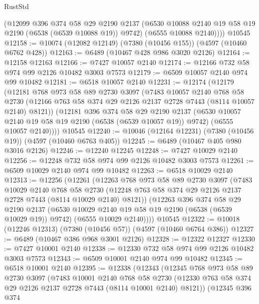 \begin{lexlean}{RustStd}
\begin{coremodule}
        (@12099
          @396
          @374
          @58
          @29
          @2190
          @2137
          (@6530 @10088 @2140 @19 @58 @19 @2190 (@6538 (@6539 @10088 @19)) @9742)
          (@6555 @10088 @2140))))
    @10545
@12158 := @10074 (@12082 @12149) (@7380 (@10456 @155)) (@4597 (@10460 @6762 @428))
@12163 := @6489 (@10467 @428 @986 @3020 @2126)
@12164 := @12158 @12163
@12166 := @7427 @10057 @2140
@12174 := @12166 @732 @58 @974 @99 @2126 @10482 @3003 @7573
@12179 := @6509 @10057 @2140 @974 @99 @10482
@12181 := @6518 @10057 @2140
@12231 := @12174
    (@12179
      (@12181
        @768
        @973
        @58
        @89
        @2730
        @3097
        (@7483
          @10057
          @2140
          @768
          @58
          @2730
          (@12166 @763 @58 @374 @29 @2126 @2137 @2728 @7443 (@8114 @10057 @2140) @8121))
        (@12181
          @396
          @374
          @58
          @29
          @2190
          @2137
          (@6530 @10057 @2140 @19 @58 @19 @2190 (@6538 (@6539 @10057 @19)) @9742)
          (@6555 @10057 @2140))))
    @10545
@12240 := @10046 (@12164 @12231) (@7380 (@10456 @19)) (@4597 (@10460 @6763 @405))
@12245 := @6489 (@10467 @405 @980 @3016 @2126)
@12246 := @12240 @12245
@12248 := @7427 @10029 @2140
@12256 := @12248 @732 @58 @974 @99 @2126 @10482 @3003 @7573
@12261 := @6509 @10029 @2140 @974 @99 @10482
@12263 := @6518 @10029 @2140
@12313 := @12256
    (@12261
      (@12263
        @768
        @973
        @58
        @89
        @2730
        @3097
        (@7483
          @10029
          @2140
          @768
          @58
          @2730
          (@12248 @763 @58 @374 @29 @2126 @2137 @2728 @7443 (@8114 @10029 @2140) @8121))
        (@12263
          @396
          @374
          @58
          @29
          @2190
          @2137
          (@6530 @10029 @2140 @19 @58 @19 @2190 (@6538 (@6539 @10029 @19)) @9742)
          (@6555 @10029 @2140))))
    @10545
@12322 := @10018 (@12246 @12313) (@7380 (@10456 @57)) (@4597 (@10460 @6764 @386))
@12327 := @6489 (@10467 @386 @968 @3001 @2126)
@12328 := @12322 @12327
@12330 := @7427 @10001 @2140
@12338 := @12330 @732 @58 @974 @99 @2126 @10482 @3003 @7573
@12343 := @6509 @10001 @2140 @974 @99 @10482
@12345 := @6518 @10001 @2140
@12395 := @12338
    (@12343
      (@12345
        @768
        @973
        @58
        @89
        @2730
        @3097
        (@7483
          @10001
          @2140
          @768
          @58
          @2730
          (@12330 @763 @58 @374 @29 @2126 @2137 @2728 @7443 (@8114 @10001 @2140) @8121))
        (@12345
          @396
          @374

\end{coremodule}
\end{lexlean}
